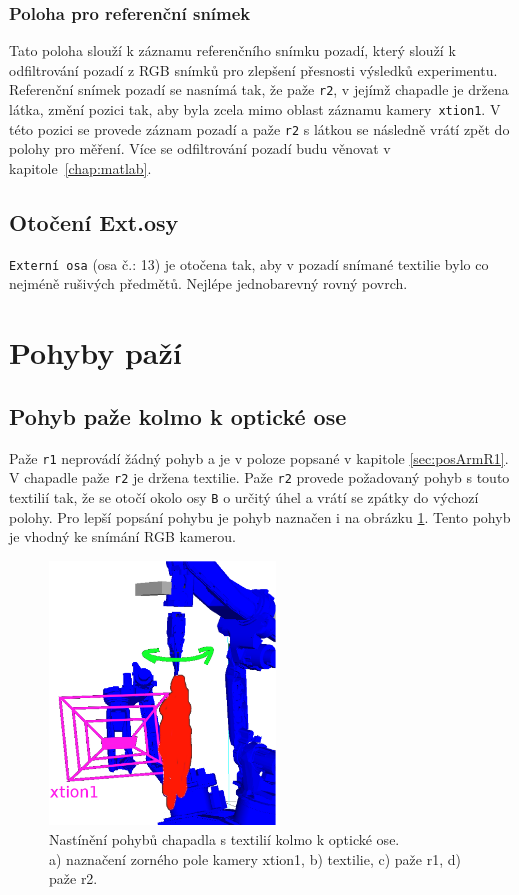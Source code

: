 \documentclass[10pt,a4paper,titlepage,oneside]{report}
\begin{document}
\subsubsection{Poloha pro referenční snímek}
\label{subsec:refRGB}
Tato poloha slouží k záznamu referenčního snímku pozadí, který slouží k odfiltrování pozadí z RGB snímků pro zlepšení přesnosti výsledků experimentu. Referenční snímek pozadí se nasnímá tak, že paže \verb|r2|, v jejímž chapadle je držena látka, změní pozici tak, aby byla zcela mimo oblast záznamu kamery~\verb|xtion1|. V této pozici se provede záznam pozadí a paže \verb|r2| s látkou se následně vrátí zpět do polohy pro měření. Více se odfiltrování pozadí budu věnovat v kapitole~\ref{chap:matlab}.

\subsection{Otočení Ext.osy}
\verb|Externí osa| (osa č.: 13) je otočena tak, aby v pozadí snímané textilie bylo co nejméně rušivých předmětů. Nejlépe jednobarevný rovný povrch.

\section{Pohyby paží}
\label{sec:moveArm}

\subsection{Pohyb paže kolmo k optické ose}
Paže \verb|r1| neprovádí žádný pohyb a je v poloze popsané v kapitole \ref{sec:posArmR1}. V chapadle paže \verb|r2| je držena textilie. Paže \verb|r2| provede požadovaný pohyb s touto textilií tak, že se otočí okolo osy \verb|B| o určitý úhel a vrátí se zpátky do výchozí polohy. Pro lepší popsání pohybu je pohyb naznačen i na obrázku \ref{fig:kolmoOptOsy}. Tento pohyb je vhodný ke snímání RGB kamerou.
\\
\begin{figure}[H]
	\centering  	
  	\includegraphics[height=7cm]{pictures/move1.eps}
  	\caption{Nastínění pohybů chapadla s textilií kolmo k optické ose.\\
  	a) naznačení zorného pole kamery xtion1, b) textilie, c) paže r1, d) paže r2.
  	}
  	\label{fig:kolmoOptOsy}
\end{figure}
\end{document}
